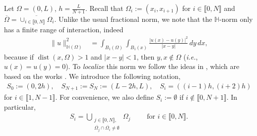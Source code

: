 \documentclass[11 pt]{article}
\newcommand\inter[1]{\llbracket #1\rrbracket}
\numberwithin{equation}{section}
\def\dist{\operatorname{dist}}
\begin{document}
Let $\Omega=(0,L)$, $h=\frac{L}{N+1}$. Recall that $\Omega_i:=(x_{i},x_{i+1})$ for $i\in\inter{0,N}$ and $\overline{\Omega}=\overline{\cup_{i\in\inter{0,N}}\Omega_i}$. Unlike the usual fractional norm, we note that the $\mathbb H$-norm only has a finite range of interaction, indeed
%
\begin{align}\label{eq:norm_R_bound}
    \|u\|^2_{\mathbb H(\Omega)} &=\int_{B_1(\Omega)}\int_{B_1(x)}\frac{|u(x)-u(y)|^2}{|x-y|}\, dy\, dx,
\end{align}
%
because if $\dist(x,\Omega)>1$ and $|x-y|<1$, then $y,x\not\in \Omega$ (\emph{i.e.}, $u(x)=u(y)=0$).  To \emph{localize} this norm we follow the ideas in \cite{Bor17}, which are based on the works \cite{Fae00,Fae02}. We introduce the following notation,
\begin{align}\label{eq:def_Si}
S_0:=(0,2h),\quad S_{N+1}:=S_{N}:=(L-2h,L),\quad S_{i}=((i-1)h,(i+2)h)
\end{align}
for $i\in \inter{1,N-1}$.  For convenience, we also define $S_i:=\emptyset$ if $i\not\in\inter{0,N+1}.$ In particular,
\begin{align*}
    S_i=\bigcup_
    {
    {\substack{j\in\inter{0,N},\\ \overline{\Omega_j}\cap \overline{\Omega_i}\neq \emptyset}}
    }\Omega_j \qquad \text{ for } i\in\inter{0,N}.
\end{align*}
\end{document}
